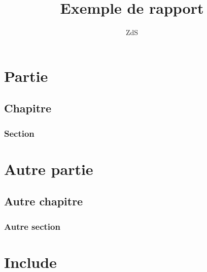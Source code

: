 \documentclass[a4paper, 12pt, french]{report}
\title{Exemple de rapport}
\author{ZdS}
\begin{document}
   \maketitle
   \tableofcontents
   \part{Partie}
      \chapter{Chapitre}
         \section{Section} 
   \part{Autre partie}
      \chapter{Autre chapitre}
         \section{Autre section}
	\part{Include}
		
\end{document}
